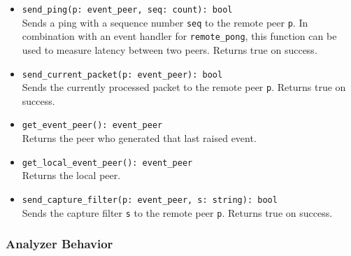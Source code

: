 \documentclass[10pt,landscape]{article}
\newcommand{\ReturnsTrueOnSuccess}{Returns true on success.\xspace}
\begin{document}
\begin{multicols*}{2}
{\begin{itemize}
    initial handshake.
    \ReturnsTrueOnSuccess
  \item \verb|send_ping(p: event_peer, seq: count): bool|\\
    Sends a ping with a sequence number \verb|seq| to the remote peer \verb|p|.
    In combination with an event handler for \verb|remote_pong|, this function
    can be used to measure latency between two peers.
    \ReturnsTrueOnSuccess
  \item \verb|send_current_packet(p: event_peer): bool|\\
    Sends the currently processed packet to the remote peer \verb|p|.
    \ReturnsTrueOnSuccess
  \item \verb|get_event_peer(): event_peer|\\
    Returns the peer who generated that last raised event.
  \item \verb|get_local_event_peer(): event_peer|\\
    Returns the local peer.
  \item \verb|send_capture_filter(p: event_peer, s: string): bool|\\
    Sends the capture filter \verb|s| to the remote peer \verb|p|.
    \ReturnsTrueOnSuccess
\end{itemize}
}

\subsubsection*{Analyzer Behavior}


\end{multicols*}
\end{document}
